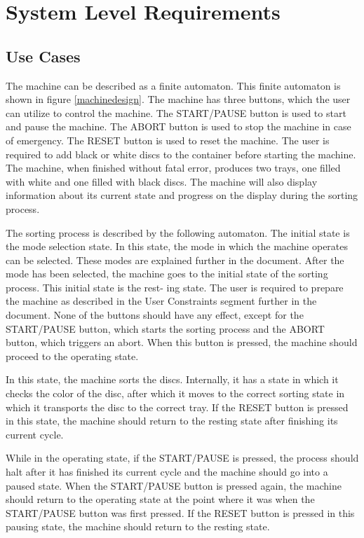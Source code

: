 \documentclass[a4paper,oneside,11pt]{article}
\begin{document}
\section{System Level Requirements}
\subsection{Use Cases}
The machine can be described as a finite automaton. This finite automaton is shown in figure \ref{machinedesign}. The machine has three buttons, which the user can utilize to control the machine. The
START/PAUSE button is used to start and pause the machine. The ABORT button is used to
stop the machine in case of emergency. The RESET button is used to reset the machine. The
user is required to add black or white discs to the container before starting the machine.
The machine, when finished without fatal error, produces two trays, one filled with white
and one filled with black discs. The machine will also display information about its current
state and progress on the display during the sorting process.

The sorting process is described by the following automaton. The initial state is the mode selection state. In this state, the mode in which the machine operates can be selected. These modes are explained further in the document. After the mode has been selected, the machine goes to the initial state of the sorting process. This initial state is the rest-
ing state. The user is required to prepare the machine as described in the User Constraints segment further in the document. None of the buttons should have any effect, except for the
START/PAUSE button, which starts the sorting process and the ABORT button, which triggers an abort. When this button is pressed, the machine should proceed to the
operating state.

In this state, the machine sorts the discs. Internally, it has a state in which it checks the
color of the disc, after which it moves to the correct sorting state in which it transports the disc
to the correct tray. If the RESET button is pressed in this state, the machine should return to
the resting state after finishing its current cycle.

While in the operating state, if the START/PAUSE is pressed, the process should halt after it has finished its current cycle 
and the machine should go into a paused state. When the START/PAUSE button is pressed
again, the machine should return to the operating state at the point where it was when the
START/PAUSE button was first pressed. If the RESET button is pressed in this pausing state,
the machine should return to the resting state.
\end{document}
